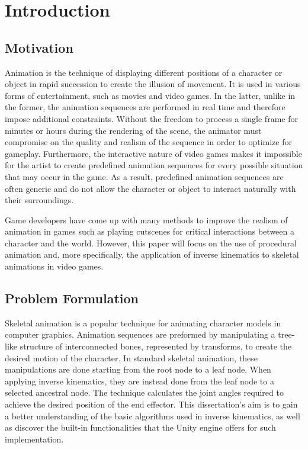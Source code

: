 \chapter{Introduction}
\section{Motivation} 
Animation is the technique of displaying different positions of a character or
object in rapid succession to create the illusion of movement. It is used in
various forms of entertainment, such as movies and video games. In the latter,
unlike in the former, the animation sequences are performed in real time and
therefore impose additional constraints. Without the freedom to process a single
frame for minutes or hours during the rendering of the scene, the animator must
compromise on the quality and realism of the sequence in order to optimize for
gameplay. Furthermore, the interactive nature of video games makes it impossible
for the artist to create predefined animation sequences for every possible
situation that may occur in the game. As a result, predefined animation
sequences are often generic and do not allow the character or object to interact naturally with their surroundings.

Game developers have come up with many methods to improve the realism of
animation in games such as playing cutscenes for critical interactions between
a character and the world. However, this paper will focus on the use of
procedural animation and, more specifically, the application of inverse
kinematics to skeletal animations in video games.
\section{Problem Formulation}

Skeletal animation is a popular technique for animating character models in
computer graphics. Animation sequences are preformed by manipulating a tree-like
structure of interconnected bones, represented by transforms, to create the
desired motion of the character. In standard skeletal animation, these
manipulations are done starting from the root node to a leaf node. When applying
inverse kinematics, they are instead done from the leaf node to a selected
ancestral node. The technique calculates the joint angles required to achieve
the desired position of the end effector. This dissertation's aim is to gain
a better understanding of the basic algorithms used in inverse kinematics, as
well as discover the built-in functionalities that the Unity engine offers for
such implementation.
